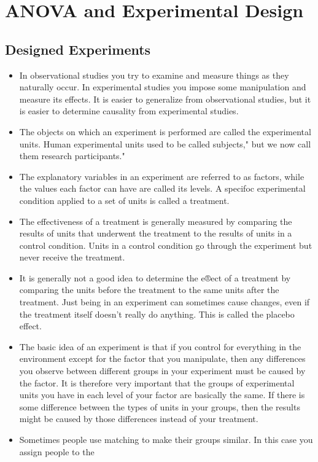 


\chapter{ANOVA and Experimental Design }

\section{Designed Experiments}
\begin{itemize}
	\item In observational studies you try to examine and measure things as they naturally occur. In experimental studies you impose some manipulation and measure its effects. It is easier to generalize from
	observational studies, but it is easier to determine causality from experimental studies.
	\item The objects on which an experiment is performed are called the experimental units. Human experimental units used to be called subjects," but we now call them research participants."
	\item The explanatory variables in an experiment are referred to as factors, while the values each factor
	can have are called its levels. A specifoc experimental condition applied to a set of units is called a
	treatment.
	\item The effectiveness of a treatment is generally measured by comparing the results of units that underwent
	the treatment to the results of units in a control condition. Units in a control condition go through the
	experiment but never receive the treatment.
	\item It is generally not a good idea to determine the e®ect of a treatment by comparing the units before
	the treatment to the same units after the treatment. Just being in an experiment can sometimes cause
	changes, even if the treatment itself doesn't really do anything. This is called the placebo effect.
	\item The basic idea of an experiment is that if you control for everything in the environment except for
	the factor that you manipulate, then any differences you observe between different groups in your
	experiment must be caused by the factor. It is therefore very important that the groups of experimental
	units you have in each level of your factor are basically the same. If there is some difference between
	the types of units in your groups, then the results might be caused by those differences instead of your
	treatment.
	\item Sometimes people use matching to make their groups similar. In this case you assign people to the

\end{itemize}
